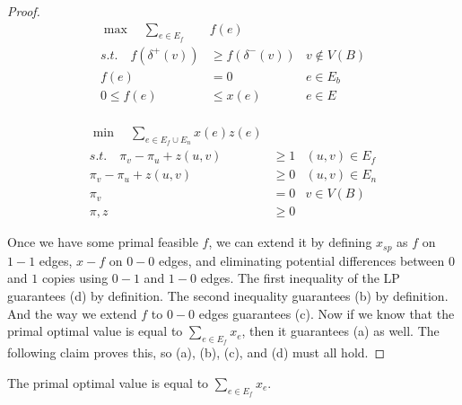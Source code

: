 \documentclass[./main.tex]{subfiles}
\begin{document}
\begin{proof}
			\begin{minipage}{0.39\textwidth}
			\begin{align*}
				\max\quad\sum_{e\in E_f}&f(e)\\
				s.t.\quad f(\delta^+(v))&\geqslant f(\delta^-(v))   &v\notin V(B)              \\
				f(e)&=0  &e\in E_b\\
				0\leqslant f(e)&\leqslant x(e) &e\in E\\
			\end{align*}
			\end{minipage}
		\hfill\vline\hfill
		\begin{minipage}{0.50\textwidth}
		\begin{align*}
			\min\quad\sum_{e\in E_f\cup E_n}x(e)z(e)\\
			s.t.\quad \pi_v - \pi_u + z(u,v)&\geqslant 1 &(u,v)\in E_f\\
			\pi_v - \pi_u + z(u,v)&\geqslant 0 &(u,v)\in E_n\\
			\pi_v &= 0 &v\in V(B)\\
			\pi, z&\geqslant 0
		\end{align*}
		\end{minipage}

	Once we have some primal feasible $f$, we can extend it by defining $x_{sp}$ as $f$ on $1-1$ edges, $x-f$ on $0-0$ edges, and eliminating potential differences between $0$ and $1$ copies using $0-1$ and $1-0$ edges. 
	The first inequality of the LP guarantees (d) by definition. 
	The second inequality guarantees (b) by definition. And the way we extend $f$ to $0-0$ edges guarantees (c). 
	Now if we know that the primal optimal value is equal to $\sum_{e\in E_f}x_e$, then it guarantees (a) as well. The following claim proves this, so (a), (b), (c), and (d) must all hold.	\end{proof}
	\vspace{2mm}
		\begin{claim}
			The primal optimal value is equal to $\sum_{e\in E_f}x_e$.
		\end{claim}
\end{document}
